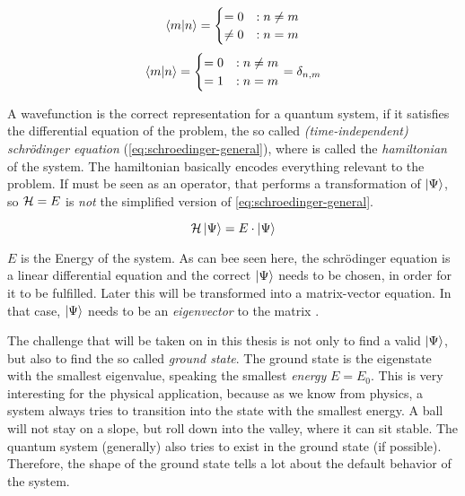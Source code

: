 \begin{equation}
    \label{eq:base-orthagonal}
    \bra{m}\ket{n} = \begin{cases}
         = 0 &: n\neq m\\
         \neq 0 &: n = m
    \end{cases}
\end{equation}
\begin{equation}
    \label{eq:base-orthonormal}
    \bra{m}\ket{n} = \begin{cases}
         = 0 &: n\neq m\\
         = 1 &: n = m
    \end{cases} = \delta_{n, m}
\end{equation}

A wavefunction is the correct representation for a quantum system, if it satisfies the differential equation of the problem, the so called \emph{(time-independent) schrödinger equation} (\autoref{eq:schroedinger-general}), where \hamiltonian is called the \emph{hamiltonian} of the system. The hamiltonian basically \glqq encodes\grqq{} everything relevant to the problem. If must be seen as an operator, that performs a transformation of $\ket{\Psi}$, so $\mathcal{H} = E$ is \emph{not} the simplified version of \autoref{eq:schroedinger-general}.

\begin{equation}
    \label{eq:schroedinger-general}
    \mathcal{H} \ket{\Psi} = E \cdot \ket{\Psi}
\end{equation}

$E$ is the Energy of the system. As can bee seen here, the schrödinger equation is a linear differential equation and the correct $\ket{\Psi}$ needs to be chosen, in order for it to be fulfilled. Later this will be transformed into a matrix-vector equation. In that case, $\ket{\Psi}$ needs to be an \emph{eigenvector} to the matrix \hamiltonian.

The challenge that will be taken on in this thesis is not only to find a valid $\ket{\Psi}$, but also to find the so called \emph{ground state}. The ground state is the eigenstate with the smallest eigenvalue, speaking the smallest \emph{energy} $E = E_0$. 
This is very interesting for the physical application, because as we know from physics, a system always tries to transition into the state  with the smallest energy. A ball will not stay on a slope, but roll down into the valley, where it can sit stable. The quantum system (generally) also tries to exist in the ground state (if possible). Therefore, the shape of the ground state tells a lot about the \glqq default\grqq{} behavior of the system.